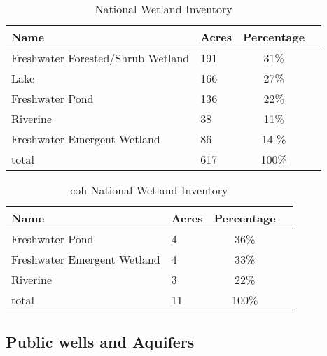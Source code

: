 \label{tab:bg_wetlands}
\begin{table}[h!]
    \begin{tabular}{l l c c }
    Name & Acres & Percentage \\
    \hline
    Freshwater Forested/Shrub Wetland & 191  & 31\%  &\\
   	Lake & 166 & 27\% &\\ 
    Freshwater Pond & 136 & 22\% &\\
    Riverine & 38 & 11\% &\\
    Freshwater Emergent Wetland & 86 & 14 \% & \\
    total & 617 & 100\% &\\
    \end{tabular}
    \caption{National Wetland Inventory}
    \label{tab:Cornwall_nwi}
\end{table}

\begin{table}[h!]
    \begin{tabular}{l l c c }
    Name & Acres & Percentage \\
    \hline
    Freshwater Pond & 4 & 36\% &\\
    Freshwater Emergent Wetland & 4 & 33\% &\\
    Riverine & 3 & 22\% &\\
    total & 11 & 100\% &\\
    \end{tabular}
    \caption{\gls{coh} National Wetland Inventory}
    \label{tab:Coh_nwi}
\end{table}


\subsection{Public wells and Aquifers}

